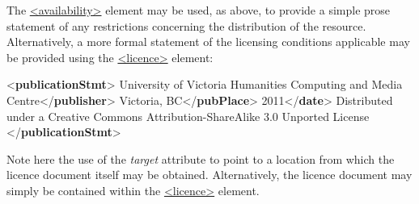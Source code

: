 The \hyperref[TEI.availability]{<availability>} element may be used, as above, to provide a simple prose statement of any restrictions concerning the distribution of the resource. Alternatively, a more formal statement of the licensing conditions applicable may be provided using the \hyperref[TEI.licence]{<licence>} element: \par\bgroup{}\exampleFont \begin{shaded}\noindent\mbox{}{<\textbf{publicationStmt}>}\mbox{}\newline 
{}University of Victoria Humanities Computing and Media Centre{</\textbf{publisher}>}\mbox{}\newline 
{}Victoria, BC{</\textbf{pubPlace}>}\mbox{}\newline 
{}2011{</\textbf{date}>}\mbox{}\newline 
{}\mbox{}\newline 
\hspace*{1em} Distributed under a Creative Commons Attribution-ShareAlike 3.0 Unported License\mbox{}\newline 
\hspace*{1em}\mbox{}\newline 
{}\mbox{}\newline 
{</\textbf{publicationStmt}>}\end{shaded}\egroup\par \noindent  Note here the use of the {\itshape target} attribute to point to a location from which the licence document itself may be obtained. Alternatively, the licence document may simply be contained within the \hyperref[TEI.licence]{<licence>} element.
